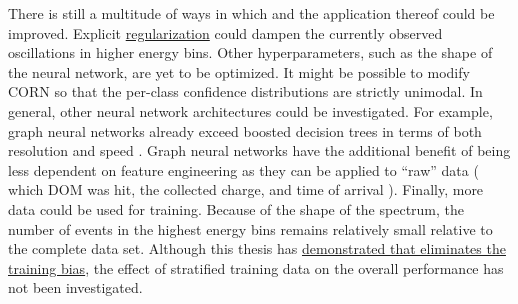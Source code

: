 There is still a multitude of ways in which \dsea{} and the application thereof could be improved.
%
Explicit \hyperref[sec:dsea:deconvolution_problem:regularization]{regularization}
could dampen the currently observed oscillations in higher energy bins.
%
Other hyperparameters,
  such as the shape of the neural network,
are yet to be optimized.
%
It might be possible to modify \ac{CORN}
  so that the per-class confidence distributions are strictly unimodal.
In general,
other neural network architectures
  could be investigated.
For example,
  graph neural networks
  already exceed boosted decision trees
    in terms of both resolution and speed \cite{minh2021gnn}.
%
Graph neural networks
have the additional benefit of
being less dependent on feature engineering
  as they can be applied to \enquote{raw} data
    (%
      which \ac{DOM} was hit,
      the collected charge, %
      and time of arrival%
    ).
%
Finally,
  more data could be used for training.
Because of the shape of the spectrum,
  the number of events in the highest energy bins
  remains relatively small
    relative to the complete data set.
Although this thesis has \hyperref[sec:unfolding:bias]{demonstrated that \dsea{} eliminates the training bias},
  the effect of stratified training data on the overall performance
  has not been investigated.


